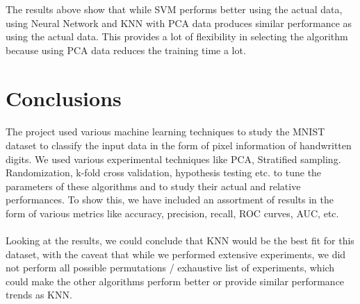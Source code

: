 \documentclass[10pt]{scrartcl}
\begin{document}
The results above show that while SVM performs better using the actual data, using Neural Network and KNN with PCA data produces similar performance as using the actual data. This provides a lot of flexibility in selecting the algorithm because using PCA data reduces the training time a lot. 

\begin{minipage}{\textwidth}
\section*{Conclusions}

\paragraph{} The project used various machine learning techniques to study the MNIST dataset to classify the input data in the form of pixel information of handwritten digits. We used various experimental techniques like PCA, Stratified sampling. Randomization, k-fold cross validation, hypothesis testing etc. to tune the parameters of these algorithms and to study their actual and relative performances. To show this, we have included an assortment of results in the form of various metrics like accuracy, precision, recall, ROC curves, AUC, etc. 

\paragraph{} Looking at the results, we could conclude that KNN would be the best fit for this dataset, with the caveat that while we performed extensive experiments, we did not perform all possible permutations / exhaustive list of experiments, which could make the other algorithms perform better or provide similar performance trends as KNN.
\end{minipage} 
 
\end{document}
